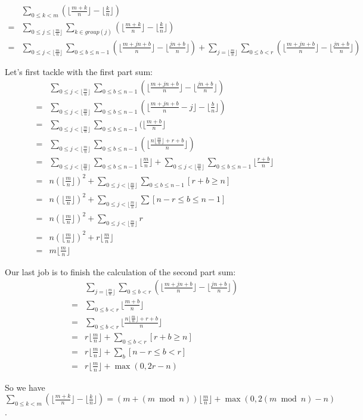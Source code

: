 \documentclass{article}
\begin{document}
\def \floormn {\lfloor \frac{m}{n} \rfloor}

\begin{equation}
    \begin{split}
        & \sum_{0\le k < m}(\lfloor \frac{m+k}{n} \rfloor - \lfloor \frac{k}{n} \rfloor)\\
      = & \sum_{0\le j \le \floormn}\sum_{k\in group(j)} (\lfloor \frac{m+k}{n} \rfloor - \lfloor \frac{k}{n} \rfloor)\\
      = & \sum_{0\le j < \floormn}\sum_{0\le b \le n-1} (\lfloor \frac{m+jn+b}{n} \rfloor - \lfloor \frac{jn+b}{n} \rfloor) + \sum_{j=\floormn}\sum_{0\le b < r} (\lfloor \frac{m+jn+b}{n} \rfloor - \lfloor \frac{jn+b}{n} \rfloor)
    \end{split}
\end{equation}

Let's first tackle with the first part sum:
\begin{equation}
    \begin{split}
        & \sum_{0\le j < \floormn}\sum_{0\le b \le n-1} (\lfloor \frac{m+jn+b}{n} \rfloor - \lfloor \frac{jn+b}{n} \rfloor) \\
      = & \sum_{0\le j < \floormn}\sum_{0\le b \le n-1} (\lfloor \frac{m+jn+b}{n} -j \rfloor - \lfloor \frac{b}{n} \rfloor) \\
      = & \sum_{0\le j < \floormn}\sum_{0\le b \le n-1} (\lfloor \frac{m+b}{n} \rfloor\\
      = & \sum_{0\le j < \floormn}\sum_{0\le b \le n-1} (\lfloor \frac{n\floormn + r + b}{n} \rfloor)\\
      = & \sum_{0\le j < \floormn}\sum_{0\le b \le n-1} \floormn + 
          \sum_{0\le j < \floormn}\sum_{0\le b \le n-1} \lfloor \frac{r+b}{n} \rfloor\\
      = & n(\floormn)^2 + \sum_{0\le j < \floormn}\sum_{0\le b \le n-1} \left[ r+b\ge n \right] \\
      = & n(\floormn)^2 + \sum_{0\le j < \floormn} \sum \left[n-r \le b \le n-1\right]\\
      = & n(\floormn)^2 + \sum_{0\le j < \floormn} r\\
      = & n(\floormn)^2 + r\floormn \\
      = & m\floormn
    \end{split}
\end{equation}

Our last job is to finish the calculation of the second part sum:
\begin{equation}
    \begin{split}
        & \sum_{j=\floormn}\sum_{0\le b < r} (\lfloor \frac{m+jn+b}{n} \rfloor - \lfloor \frac{jn+b}{n} \rfloor) \\
      = & \sum_{0\le b < r}\lfloor \frac{m+b}{n} \rfloor\\
      = & \sum_{0\le b < r} \lfloor \frac{n\floormn + r + b}{n} \rfloor\\
      = & r\floormn + \sum_{0 \le b < r}\left[r+b\ge n\right]\\
      = & r\floormn + \sum_{b}\left[n-r \le b < r \right]\\
      = & r\floormn + \max{(0, 2r-n)}
    \end{split}
\end{equation}

So we have$\sum_{0\le k < m}(\lfloor \frac{m+k}{n} \rfloor - \lfloor \frac{k}{n} \rfloor) = (m + (m \bmod n))\floormn + \max{(0, 2(m \bmod n)-n)}$.
\end{document}
